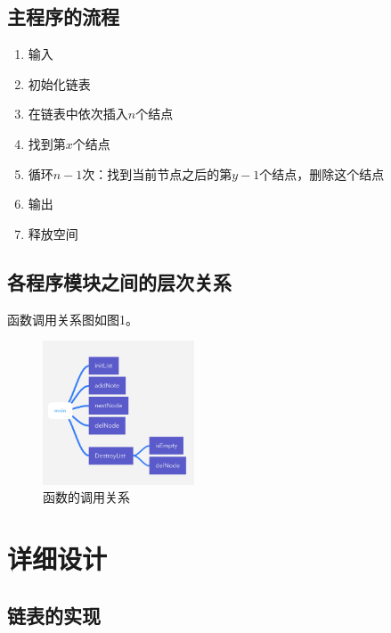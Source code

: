 \documentclass{article}
\begin{document}
\subsection{主程序的流程}

\begin{enumerate}
    \item 输入
    \item 初始化链表
    \item 在链表中依次插入$n$个结点
    \item 找到第$x$个结点
    \item 循环$n-1$次：找到当前节点之后的第$y-1$个结点，删除这个结点
    \item 输出
    \item 释放空间
\end{enumerate}

\subsection{各程序模块之间的层次关系}

函数调用关系图如图1。

\begin{figure}[htbp]
    
    \centering\includegraphics[width=0.4\textwidth]{./Images/pic1.jpg}
    
    \caption{函数的调用关系}
    
\end{figure}

\section{详细设计}

\subsection{链表的实现}
\end{document}
